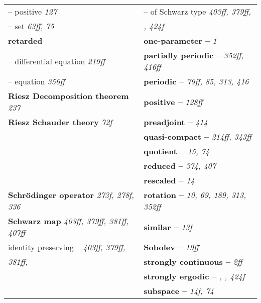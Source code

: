 \begin{longtable}{p{}p{}}
\quad -- positive \textit{127} & \quad -- of Schwarz type \textit{403ff, 379ff,} \\
\quad -- set \textit{63ff, 75} & \quad\quad \textit{, 424f} \\
\textbf{retarded} & \textbf{one-parameter --} \textit{1} \\
\quad -- differential equation \textit{219ff} & \textbf{partially periodic --} \textit{352ff, 416ff} \\
\quad -- equation \textit{356ff} & \textbf{periodic --} \textit{79ff, 85, 313, 416} \\
\textbf{Riesz Decomposition theorem} \textit{237} & \textbf{positive --} \textit{128ff} \\
\textbf{Riesz Schauder theory} \textit{72f} & \textbf{preadjoint --} \textit{414} \\
& \textbf{quasi-compact --} \textit{214ff, 343ff} \\
& \textbf{quotient --} \textit{15, 74} \\
& \textbf{reduced --} \textit{374, 407} \\
& \textbf{rescaled --} \textit{14} \\
\textbf{Schrödinger operator} \textit{273f, 278f, 336} & \textbf{rotation --} \textit{10, 69, 189, 313, 352ff} \\
\textbf{Schwarz map} \textit{403ff, 379ff, 381ff, 407ff} & \textbf{similar --} \textit{13f} \\
\quad identity preserving -- \textit{403ff, 379ff,} & \textbf{Sobolev --} \textit{19ff} \\
\quad\quad \textit{381ff, } & \textbf{strongly continuous --} \textit{2ff} \\
& \textbf{strongly ergodic --} \textit{, , 424f} \\
& \textbf{subspace --} \textit{14f, 74} \\


\end{longtable}
